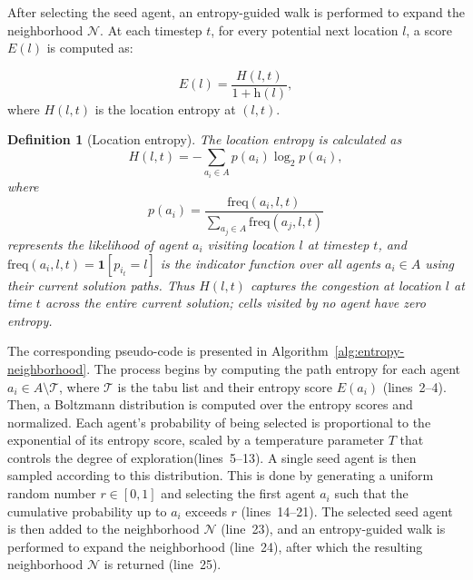 \documentclass[review]{jair}
\newtheorem{definition}{Definition}
\begin{document}
After selecting the seed agent, an entropy-guided walk is performed to expand the neighborhood \( \mathcal{N} \). At each timestep \( t \), for every potential next location \( l \), a score \( E(l) \) is computed as:

\begin{equation}
E(l) = \frac{H(l, t)}{1 + \text{h}(l)},
\end{equation}
where
\( H(l, t) \) is the location entropy at \( (l, t) \).

\begin{definition}[Location entropy]
The location entropy is calculated as
\begin{equation}
H(l, t) = -\sum_{a_i \in A} p(a_i) \log_2 p(a_i),
\end{equation}
where
\begin{equation}
p(a_i) = \frac{\text{freq}(a_i, l, t)}{\sum_{a_j \in A} \text{freq}(a_j, l, t)}
\end{equation}
represents the likelihood of agent $a_i$ visiting location $l$ at timestep $t$, and $\text{freq}(a_i, l, t) = \mathbf{1}[p_{i_t} = l]$ is the indicator function over \emph{all} agents $a_i \in A$ using their current solution paths. Thus $H(l,t)$ captures the congestion at location $l$ at time $t$ across the entire current solution; cells visited by no agent have zero entropy.
\end{definition}
%

The corresponding pseudo-code is presented in Algorithm~\ref{alg:entropy-neighborhood}. The process begins by computing the path entropy for each agent \( a_i \in A \setminus \mathcal{T} \), where \( \mathcal{T} \) is the tabu list and their entropy score \( E(a_i) \) (lines~2--4). 
Then, a Boltzmann distribution is computed over the entropy scores and normalized. Each agent's probability of being selected is proportional to the exponential of its entropy score, scaled by a temperature parameter \( T \) that controls the degree of exploration(lines~5--13). 
A single seed agent is then sampled according to this distribution. This is done by generating a uniform random number \( r \in [0, 1] \) and selecting the first agent \( a_i \) such that the cumulative probability up to \( a_i \) exceeds \( r \) (lines~14--21).
The selected seed agent is then added to the neighborhood \(\mathcal{N}\) (line~23), and an entropy-guided walk is performed to expand the neighborhood (line~24), after which the resulting neighborhood \(\mathcal{N}\) is returned (line~25). 
\end{document}
